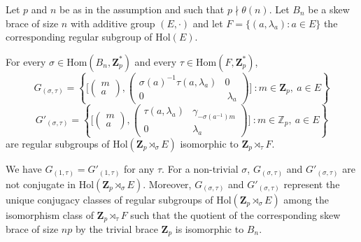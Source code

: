 \documentclass[10pt,a4paper]{amsart}
\newcommand{\Hol}{\mathrm{Hol}}
\newcommand{\Hom}{\mathrm{Hom}}
\newcommand{\Z}{\mathbf Z}
\begin{document}
\begin{theorem}\label{2Gs}
Let $p$ and $n$ be as in the assumption and such that $p\nmid \theta(n)$. Let $B_n$ be a skew brace of size $n$ with additive group $(E,\cdot)$ and let
	$F=\{(a,\lambda_a): a\in E\}$ the corresponding regular subgroup of $\Hol(E)$.
		
	For every $\sigma\in\Hom(B_n,\Z_p^*)$ and every $\tau\in \Hom(F,\Z_p^*)$,
	$$
	G_{(\sigma,\tau)}=\left\{\Big[\begin{pmatrix}m\\a\end{pmatrix},
	\begin{pmatrix}\sigma(a)^{-1}\tau(a,\lambda_a) & 0\\0&\ \lambda_a\end{pmatrix}\Big]
		\ \colon 
		m\in\Z_p,\  a\in E
		\right\}
	$$
	$$G'_{(\sigma,\tau)}=\left\{\Big[\begin{pmatrix}m\\a\end{pmatrix},
		\begin{pmatrix}\tau(a,\lambda_a) & \gamma_{-\sigma(a^{-1})m}\\0&\lambda_a\end{pmatrix}\Big]
		\ \colon 
		m\in\mathbb Z_p,\  a\in E
		\right\}
	$$
	are regular subgroups of $\Hol(\Z_p\rtimes_{\sigma}E)$
	isomorphic to $\Z_p\rtimes_{\tau} F$.
		
	We have $G_{(1,\tau)}=G'_{(1,\tau)}$ for any $\tau$. For a
	non-trivial $\sigma$,
	$G_{(\sigma,\tau)}$ and $G'_{(\sigma,\tau)}$ are not conjugate in $\Hol(\Z_p\rtimes_{\sigma}E)$. Moreover, $G_{(\sigma,\tau)}$
	and $G'_{(\sigma,\tau)}$ represent the unique conjugacy classes of regular 
	subgroups of $\Hol(\Z_p\rtimes_{\sigma} E)$ among the isomorphism class of $\Z_p\rtimes_{\tau}F$ such that the quotient of the corresponding skew brace of size $np$ by the trivial brace $\Z_p$ is isomorphic to $B_n$.
\end{theorem}
\end{document}

